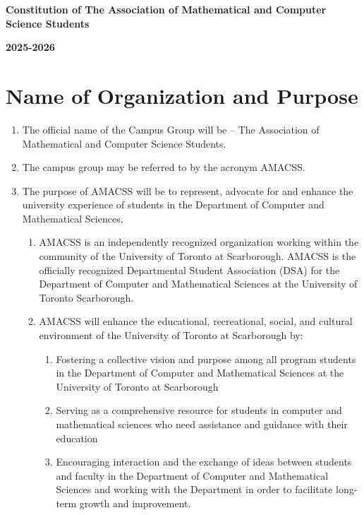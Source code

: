 \documentclass[12pt,a4paper]{article}
\begin{document}
\begin{center}
{\Large\textbf{Constitution of The Association of Mathematical and Computer Science Students}}

\vspace{0.5cm}
{\large\textbf{2025-2026}}
\end{center}

\vspace{1cm}

\section{Name of Organization and Purpose}

\begin{enumerate}
\item The official name of the Campus Group will be – The Association of Mathematical and Computer Science Students.

\item The campus group may be referred to by the acronym AMACSS.

\item The purpose of AMACSS will be to represent, advocate for and enhance the university experience of students in the Department of Computer and Mathematical Sciences.

\begin{enumerate}
\item AMACSS is an independently recognized organization working within the community of the University of Toronto at Scarborough. AMACSS is the officially recognized Departmental Student Association (DSA) for the Department of Computer and Mathematical Sciences at the University of Toronto Scarborough.

\item AMACSS will enhance the educational, recreational, social, and cultural environment of the University of Toronto at Scarborough by:

\begin{enumerate}
\item Fostering a collective vision and purpose among all program students in the Department of Computer and Mathematical Sciences at the University of Toronto at Scarborough

\item Serving as a comprehensive resource for students in computer and mathematical sciences who need assistance and guidance with their education

\item Encouraging interaction and the exchange of ideas between students and faculty in the Department of Computer and Mathematical Sciences and working with the Department in order to facilitate long-term growth and improvement.


\end{enumerate}
\end{enumerate}
\end{enumerate}
\end{document}
